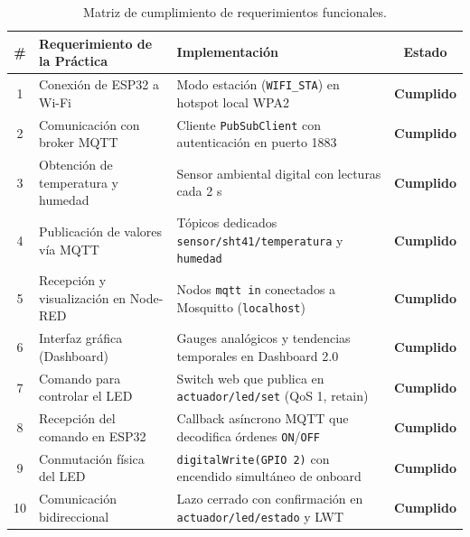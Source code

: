 \begin{table}[H]
\centering
\small
\begin{tabularx}{\textwidth}{c p{6.0cm} X c}
\toprule
\textbf{\#} & \textbf{Requerimiento de la Práctica} & \textbf{Implementación} & \textbf{Estado} \\
\midrule
1 & Conexión de ESP32 a Wi-Fi & Modo estación (\texttt{WIFI\_STA}) en hotspot local WPA2 & \textbf{Cumplido} \\
2 & Comunicación con broker MQTT & Cliente \texttt{PubSubClient} con autenticación en puerto 1883 & \textbf{Cumplido} \\
3 & Obtención de temperatura y humedad & Sensor ambiental digital con lecturas cada 2 s & \textbf{Cumplido} \\
4 & Publicación de valores vía MQTT & Tópicos dedicados \texttt{sensor/sht41/temperatura} y \texttt{humedad} & \textbf{Cumplido} \\
5 & Recepción y visualización en Node-RED & Nodos \texttt{mqtt in} conectados a Mosquitto (\texttt{localhost}) & \textbf{Cumplido} \\
6 & Interfaz gráfica (Dashboard) & Gauges analógicos y tendencias temporales en Dashboard 2.0 & \textbf{Cumplido} \\
7 & Comando para controlar el LED & Switch web que publica en \texttt{actuador/led/set} (QoS 1, retain) & \textbf{Cumplido} \\
8 & Recepción del comando en ESP32 & Callback asíncrono MQTT que decodifica órdenes \texttt{ON}/\texttt{OFF} & \textbf{Cumplido} \\
9 & Conmutación física del LED & \texttt{digitalWrite(GPIO 2)} con encendido simultáneo de onboard & \textbf{Cumplido} \\
10 & Comunicación bidireccional & Lazo cerrado con confirmación en \texttt{actuador/led/estado} y LWT & \textbf{Cumplido} \\
\bottomrule
\end{tabularx}
\caption{Matriz de cumplimiento de requerimientos funcionales.}
\label{tab:req_funcionales}
\end{table}
